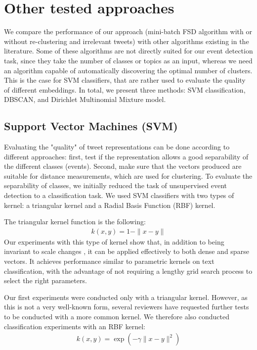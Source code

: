 \section{Other tested approaches}
We compare the performance of our approach (mini-batch FSD algorithm with or without re-clustering and irrelevant tweets) with other algorithms existing in the literature. Some of these algorithms are not directly suited for our event detection task, since they take the number of classes or topics as an input, whereas we need an algorithm capable of automatically discovering the optimal number of clusters. This is the case for SVM classifiers, that are rather used to evaluate the quality of different embeddings. In total, we present three methods: SVM classification, DBSCAN, and Dirichlet Multinomial Mixture model.


\subsection{Support Vector Machines (SVM)}
Evaluating the "quality" of tweet representations can be done according to different approaches: first, test if the representation allows a good separability of the different classes (events). Second, make sure that the vectors produced are suitable for distance measurements, which are used for clustering. To evaluate the separability of classes, we initially reduced the task of unsupervised event detection to a classification task. We used SVM classifiers with two types of kernel: a triangular kernel \cite{fleuret2003scale} and a Radial Basis Function (RBF) kernel. 

The triangular kernel function is the following:
\begin{align}
\label{eq:triangular kernel}
k(x, y) = 1 - \|x - y\|
\end{align}
Our experiments with this type of kernel show that, in addition to being invariant to scale changes \citep{fleuret2003scale}, it can be applied effectively to both dense and sparse vectors. It achieves performance similar to parametric kernels on text classification, with the advantage of not requiring a lengthy grid search process to select the right parameters.

Our first experiments were conducted only with a triangular kernel. However, as this is not a very well-known form, several reviewers have requested further tests to be conducted with a more common kernel. We therefore also conducted classification experiments with an RBF kernel:
\begin{align}
\label{eq:RBF kernel}
k(x, y) = \exp(-\gamma \|x - y \|^{2})
\end{align}


